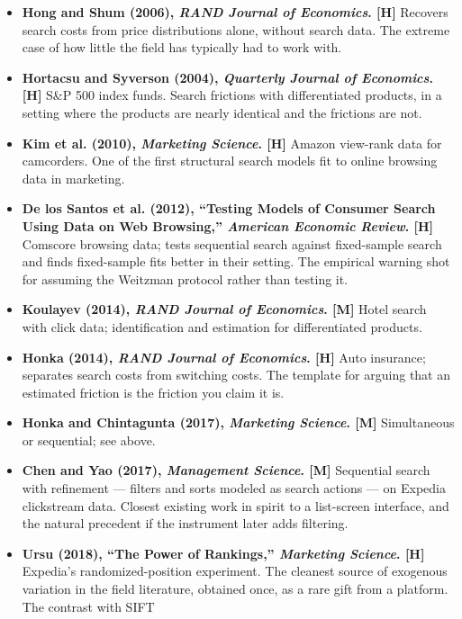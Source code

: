 \documentclass[
  letterpaper,
  DIV=11,
  numbers=noendperiod]{scrartcl}
\providecommand{\tightlist}{%
  \setlength{\itemsep}{0pt}\setlength{\parskip}{0pt}}
\begin{document}
\begin{itemize}
\tightlist
\item
  \textbf{Hong and Shum (2006), \emph{RAND Journal of Economics}.
  {[}H{]}} Recovers search costs from price distributions alone, without
  search data. The extreme case of how little the field has typically
  had to work with.
\item
  \textbf{Hortacsu and Syverson (2004), \emph{Quarterly Journal of
  Economics}. {[}H{]}} S\&P 500 index funds. Search frictions with
  differentiated products, in a setting where the products are nearly
  identical and the frictions are not.
\item
  \textbf{Kim et al. (2010), \emph{Marketing Science}. {[}H{]}} Amazon
  view-rank data for camcorders. One of the first structural search
  models fit to online browsing data in marketing.
\item
  \textbf{De los Santos et al. (2012), ``Testing Models of Consumer
  Search Using Data on Web Browsing,'' \emph{American Economic Review}.
  {[}H{]}} Comscore browsing data; tests sequential search against
  fixed-sample search and finds fixed-sample fits better in their
  setting. The empirical warning shot for assuming the Weitzman protocol
  rather than testing it.
\item
  \textbf{Koulayev (2014), \emph{RAND Journal of Economics}. {[}M{]}}
  Hotel search with click data; identification and estimation for
  differentiated products.
\item
  \textbf{Honka (2014), \emph{RAND Journal of Economics}. {[}H{]}} Auto
  insurance; separates search costs from switching costs. The template
  for arguing that an estimated friction is the friction you claim it
  is.
\item
  \textbf{Honka and Chintagunta (2017), \emph{Marketing Science}.
  {[}M{]}} Simultaneous or sequential; see above.
\item
  \textbf{Chen and Yao (2017), \emph{Management Science}. {[}M{]}}
  Sequential search with refinement --- filters and sorts modeled as
  search actions --- on Expedia clickstream data. Closest existing work
  in spirit to a list-screen interface, and the natural precedent if the
  instrument later adds filtering.
\item
  \textbf{Ursu (2018), ``The Power of Rankings,'' \emph{Marketing
  Science}. {[}H{]}} Expedia's randomized-position experiment. The
  cleanest source of exogenous variation in the field literature,
  obtained once, as a rare gift from a platform. The contrast with SIFT

\end{itemize}
\end{document}
